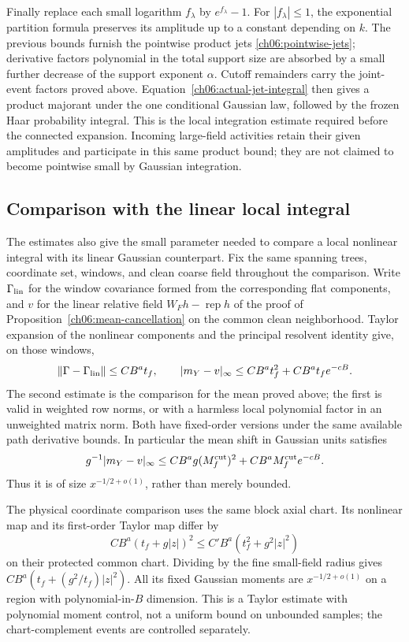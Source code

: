 Finally replace each small logarithm $f_\lambda$ by
$e^{f_\lambda}-1$. For $|f_\lambda|\le1$, the exponential partition
formula preserves its amplitude up to a constant depending on $k$.
The previous bounds furnish the pointwise product jets
\eqref{ch06:pointwise-jets}; derivative factors polynomial in the total
support size are absorbed by a small further decrease of the support exponent $\alpha$.
Cutoff remainders carry the joint-event factors proved above.
Equation~\eqref{ch06:actual-jet-integral} then gives a product majorant
under the one conditional Gaussian law, followed by the frozen
Haar probability integral. This is the local integration estimate
required before the connected expansion. Incoming large-field
activities retain their given amplitudes and participate in this same
product bound; they are not claimed to become pointwise small by
Gaussian integration.

\subsection{Comparison with the linear local integral}
\label{ch06:linear-comparison}

The estimates also give the small parameter needed to compare a local
nonlinear integral with its linear Gaussian counterpart. Fix the same
spanning trees, coordinate set, windows, and clean coarse field throughout the
comparison. Write $\Gamma_{\rm lin}$ for the window covariance formed
from the corresponding flat components, and $v$ for the
linear relative field $W_Fh-\operatorname{rep}h$ of the proof of Proposition~\ref{ch06:mean-cancellation} on the common clean neighborhood.
Taylor expansion of the nonlinear components and the principal resolvent identity
give, on those windows,
\[
 \|\Gamma-\Gamma_{\rm lin}\|\le C B^a t_f,\qquad
 |m_Y-v|_\infty\le C B^a t_f^2+C B^a t_f e^{-cB}.
\]
The second estimate is the comparison for the mean proved above; the first
is valid in weighted row norms, or with a harmless local polynomial
factor in an unweighted matrix norm. Both have fixed-order versions
under the same available path derivative bounds. In particular the
mean shift in Gaussian units satisfies
\[
 g^{-1}|m_Y-v|_\infty
       \le C B^a g(M_f^{\rm cut})^2+
                         C B^a M_f^{\rm cut}e^{-cB}.
\]
Thus it is of size $x^{-1/2+o(1)}$, rather than merely bounded.

The physical coordinate comparison uses the same block axial chart.
Its nonlinear map and its first-order Taylor map differ by
\[
 C B^a(t_f+g|z|)^2
       \le C'B^a(t_f^2+g^2|z|^2)
\]
on their protected common chart. Dividing by the fine small-field
radius gives $C B^a(t_f+(g^2/t_f)|z|^2)$.
All its fixed Gaussian moments are $x^{-1/2+o(1)}$ on a region
with polynomial-in-$B$ dimension. This is a Taylor estimate with
polynomial moment control, not a uniform bound on unbounded samples;
the chart-complement events are controlled separately.

